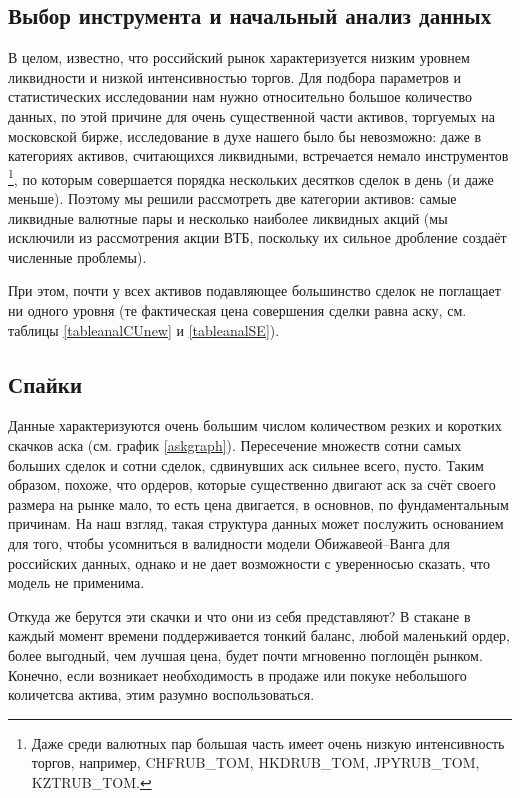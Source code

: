 \subsection{Выбор инструмента и начальный анализ данных} \label{InitAnal}
В целом, известно, что российский рынок характеризуется низким уровнем ликвидности и низкой интенсивностью торгов. 
Для подбора параметров и статистических исследовании
нам нужно относительно большое количество данных, по этой причине
для очень существенной части активов, торгуемых на московской бирже, 
исследование в духе нашего было бы невозможно: даже в категориях 
активов, считающихся ликвидными,
встречается немало инструментов \footnote{Даже среди валютных пар большая 
часть имеет очень низкую интенсивность торгов, например, CHFRUB\_TOM, HKDRUB\_TOM, 
JPYRUB\_TOM, KZTRUB\_TOM.}, по которым совершается порядка нескольких десятков сделок в день (и даже меньше). 
Поэтому мы решили рассмотреть две категории активов: самые ликвидные валютные пары
и несколько наиболее ликвидных акций (мы исключили из рассмотрения акции ВТБ, поскольку их сильное дробление создаёт 
численные проблемы).
\par
При этом, почти у всех активов подавляющее большинство сделок не поглащает ни одного уровня 
(те фактическая цена совершения сделки равна аску, см. таблицы \ref{tableanalCUnew} и \ref{tableanalSE}). 
\par


\subsection{Спайки}

Данные характеризуются очень большим числом количеством резких и коротких скачков аска (см. график \ref{askgraph}). 
Пересечение множеств
сотни самых больших сделок и сотни сделок, сдвинувших аск сильнее всего, пусто. Таким образом, похоже, что ордеров,
которые существенно двигают аск за счёт своего размера на рынке мало, то есть цена двигается, в основнов, по фундаментальным причинам.
На наш взгляд, такая структура данных может послужить основанием для того, чтобы усомниться в валидности модели Обижавеой--Ванга 
для российских данных, однако и не дает возможности с уверенносью сказать, что модель не применима. 
\par
Откуда же берутся эти скачки и что они из себя представляют? В стакане в каждый момент времени поддерживается тонкий баланс, любой
маленький ордер, более выгодный, чем лучшая цена, будет почти мгновенно поглощён рынком. Конечно, если возникает необходимость в продаже
или покуке небольшого количетсва актива, этим разумно воспользоваться.

